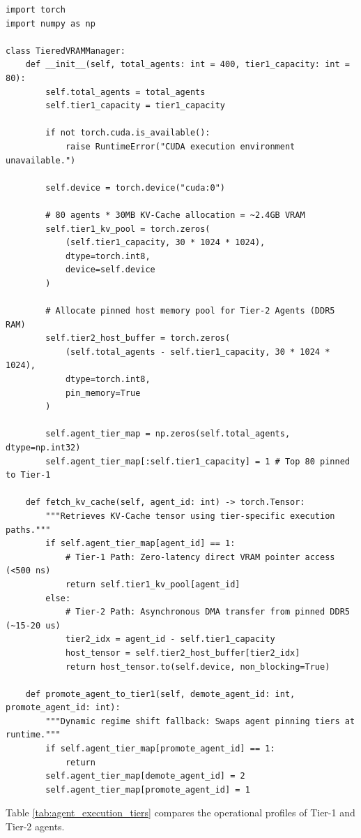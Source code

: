 \vspace{\baselineskip}

\label{listing:tiered_vram_manager}
\begin{verbatim}
import torch
import numpy as np

class TieredVRAMManager:
    def __init__(self, total_agents: int = 400, tier1_capacity: int = 80):
        self.total_agents = total_agents
        self.tier1_capacity = tier1_capacity
        
        if not torch.cuda.is_available():
            raise RuntimeError("CUDA execution environment unavailable.")
        
        self.device = torch.device("cuda:0")
        
        # 80 agents * 30MB KV-Cache allocation = ~2.4GB VRAM
        self.tier1_kv_pool = torch.zeros(
            (self.tier1_capacity, 30 * 1024 * 1024), 
            dtype=torch.int8, 
            device=self.device
        )
        
        # Allocate pinned host memory pool for Tier-2 Agents (DDR5 RAM)
        self.tier2_host_buffer = torch.zeros(
            (self.total_agents - self.tier1_capacity, 30 * 1024 * 1024),
            dtype=torch.int8, 
            pin_memory=True
        )
        
        self.agent_tier_map = np.zeros(self.total_agents, dtype=np.int32)
        self.agent_tier_map[:self.tier1_capacity] = 1 # Top 80 pinned to Tier-1

    def fetch_kv_cache(self, agent_id: int) -> torch.Tensor:
        """Retrieves KV-Cache tensor using tier-specific execution paths."""
        if self.agent_tier_map[agent_id] == 1:
            # Tier-1 Path: Zero-latency direct VRAM pointer access (<500 ns)
            return self.tier1_kv_pool[agent_id]
        else:
            # Tier-2 Path: Asynchronous DMA transfer from pinned DDR5 (~15-20 us)
            tier2_idx = agent_id - self.tier1_capacity
            host_tensor = self.tier2_host_buffer[tier2_idx]
            return host_tensor.to(self.device, non_blocking=True)

    def promote_agent_to_tier1(self, demote_agent_id: int, promote_agent_id: int):
        """Dynamic regime shift fallback: Swaps agent pinning tiers at runtime."""
        if self.agent_tier_map[promote_agent_id] == 1:
            return
        self.agent_tier_map[demote_agent_id] = 2
        self.agent_tier_map[promote_agent_id] = 1
\end{verbatim}
\par\vspace*{\baselineskip}
Table \ref{tab:agent_execution_tiers} compares the operational profiles of Tier-1 and Tier-2 agents.

